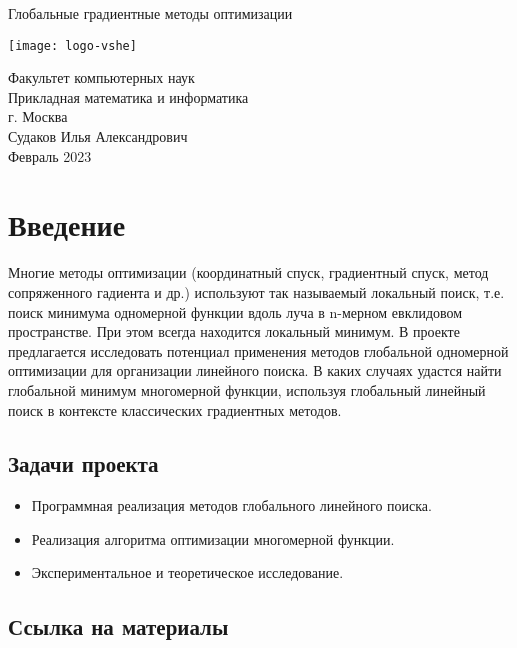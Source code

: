 \documentclass{article}
\begin{document}
    \begin{center}
    \begin{huge}
    Глобальные градиентные методы оптимизации\\
    \end{huge}

    \vspace{1.8cm}
    \texttt{[image: logo-vshe]}

    \vspace{7cm}

    Факультет компьютерных наук\\
    Прикладная математика и информатика\\
    г. Москва\\

    \vspace{1cm}
    Судаков Илья Александрович\\
    Февраль 2023\\
    \end{center}
    \newpage
    \section{Введение}
    Многие методы оптимизации (координатный спуск, градиентный спуск, метод сопряженного гадиента и др.) используют так называемый локальный поиск, т.е. поиск минимума одномерной функции вдоль луча в n-мерном евклидовом пространстве. При этом всегда находится локальный минимум. В проекте предлагается исследовать потенциал применения методов глобальной одномерной оптимизации для организации линейного поиска. В каких случаях удастся найти глобальной минимум многомерной функции, используя глобальный линейный поиск в контексте классических градиентных методов.

    \subsection{Задачи проекта}
    \begin{itemize}
        \item Программная реализация методов глобального линейного поиска.
        \item Реализация алгоритма оптимизации многомерной функции.
        \item Экспериментальное и теоретическое исследование.
    \end{itemize}

    \subsection{Ссылка на материалы}
    \href{https://github.com/sudakovcom/global-optimization.git}{}
\end{document}
